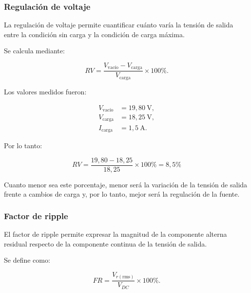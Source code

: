 \documentclass[12pt,a4paper]{article}
\begin{document}
	\subsubsection{Regulación de voltaje}
	
	La regulación de voltaje permite cuantificar cuánto varía la tensión de salida
	entre la condición sin carga y la condición de carga máxima.
	
	Se calcula mediante:
	
	\begin{equation}
		RV
		=
		\frac{
			V_{\text{vacío}}
			-
			V_{\text{carga}}
		}{
			V_{\text{carga}}
		}
		\times 100\%.
	\end{equation}
	
	Los valores medidos fueron:
	
	\begin{align}
		V_{\text{vacío}}
		&=
		19,80~\text{V},
		\\
		V_{\text{carga}}
		&=
		18,25~\text{V},
		\\
		I_{\text{carga}}
		&=
		1,5~\text{A}.
	\end{align}
	
	Por lo tanto:                                                                                                            
	
	\begin{equation}
		RV
		=
		\frac{
			19,80
			-
			18,25
		}{
			18,25
		}
		\times 100\%
		=
		8,5\%
	\end{equation}
	
	Cuanto menor sea este porcentaje, menor será la variación de la tensión de
	salida frente a cambios de carga y, por lo tanto, mejor será la regulación de la
	fuente.
	
	\subsubsection{Factor de ripple}
	
	El factor de ripple permite expresar la magnitud de la componente alterna
	residual respecto de la componente continua de la tensión de salida.
	
	Se define como:
	
	\begin{equation}
		FR
		=
		\frac{
			V_{r(\mathrm{rms})}
		}{
			V_{DC}
		}
		\times 100\%.
	\end{equation}
	
\end{document}
